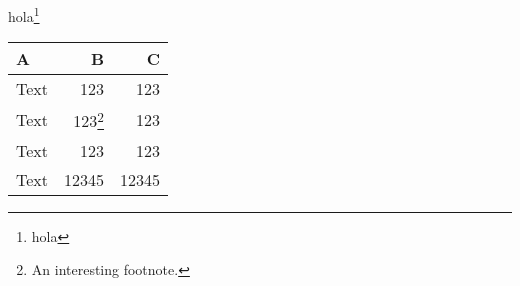 hola\footnote{hola}

\begin{table}[h]
	\begin{tabular}{lrr}
		\toprule
		A    & B     & C     \\ \midrule
		Text & 123   & 123   \\
		Text & 123\footnote{An interesting footnote.} & 123 \\
		Text & 123   & 123   \\ \midrule
		Text & 12345 & 12345 \\ \bottomrule
	\end{tabular}
\end{table}